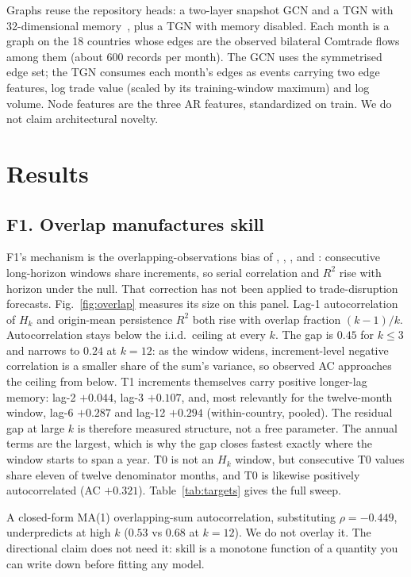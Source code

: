 \documentclass[10pt]{article}
\begin{document}
Graphs reuse the repository heads: a two-layer snapshot GCN and a TGN with 32-dimensional memory~\citep{ref10}, plus a TGN with memory disabled. Each month is a graph on the 18 countries whose edges are the observed bilateral Comtrade flows among them (about 600 records per month). The GCN uses the symmetrised edge set; the TGN consumes each month's edges as events carrying two edge features, log trade value (scaled by its training-window maximum) and log volume. Node features are the three AR features, standardized on train. We do not claim architectural novelty.

\section{Results}
\label{sec:results}

\subsection{F1. Overlap manufactures skill}

F1's mechanism is the overlapping-observations bias of \citet{ref29}, \citet{ref30}, \citet{ref31}, and \citet{ref32}: consecutive long-horizon windows share increments, so serial correlation and $R^2$ rise with horizon under the null. That correction has not been applied to trade-disruption forecasts. Fig.~\ref{fig:overlap} measures its size on this panel. Lag-1 autocorrelation of $H_k$ and origin-mean persistence $R^2$ both rise with overlap fraction $(k-1)/k$. Autocorrelation stays below the i.i.d.\ ceiling at every $k$. The gap is $0.45$ for $k\le 3$ and narrows to $0.24$ at $k=12$: as the window widens, increment-level negative correlation is a smaller share of the sum's variance, so observed AC approaches the ceiling from below. T1 increments themselves carry positive longer-lag memory: lag-2 $+0.044$, lag-3 $+0.107$, and, most relevantly for the twelve-month window, lag-6 $+0.287$ and lag-12 $+0.294$ (within-country, pooled). The residual gap at large $k$ is therefore measured structure, not a free parameter. The annual terms are the largest, which is why the gap closes fastest exactly where the window starts to span a year. T0 is not an $H_k$ window, but consecutive T0 values share eleven of twelve denominator months, and T0 is likewise positively autocorrelated (AC $+0.321$). Table~\ref{tab:targets} gives the full sweep.

A closed-form MA(1) overlapping-sum autocorrelation, substituting $\rho=-0.449$, underpredicts at high $k$ ($0.53$ vs $0.68$ at $k=12$). We do not overlay it. The directional claim does not need it: skill is a monotone function of a quantity you can write down before fitting any model.
\end{document}
